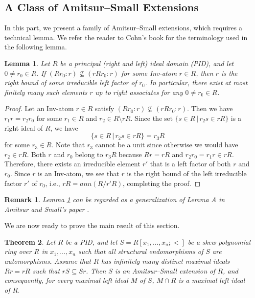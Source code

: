 \documentclass[11pt,a4paper]{article}
\theoremstyle{theorem}
\newtheorem{theorem}{Theorem}[section]
\newtheorem{lemma}[theorem]{Lemma}
\newtheorem{remark}{Remark}[section]
\numberwithin{equation}{section}
\begin{document}
	\subsection{A Class of Amitsur--Small Extensions}
			In this part, we present a family of Amitsur--Small extensions, which requires  a technical lemma. We refer the reader to Cohn's book \cite{Freeidealrings} for the terminology used in the following lemma. 
		\begin{lemma}\label{lem: LemmaA-Inv}
		Let $R$ be a principal (right and left) ideal domain (PID), and let $0\neq r_0\in R$. If 
		$(Rr_0:r)\nsubseteq (rRr_0:r)$
		for some Inv-atom $r\in R$, then $r$ is the right bound of some irreducible left factor of $r_0$. In particular, there exist at most finitely many such elements $r$ up to right associates for any $0\neq r_0\in R$. 
	\end{lemma}
	\begin{proof}
		Let an Inv-atom $r\in R$ satisfy 
		$(Rr_0:r)\nsubseteq (rRr_0:r).$
		Then  we have
		$r_1r=r_2r_0$ for some \(r_1\in R\) and $r_2\in R\setminus rR$. Since  the set 
		$\{s\in R\, |\, r_2s\in rR\}$
		is a right ideal of $R$, we have
		$$\{s\in R\, |\, r_2s\in rR\}=r_3R$$ for some $r_3\in R$. Note that $r_3$ cannot be a unit since otherwise we would have $r_2\in rR$.
		Both $r$ and $r_0$ belong to $r_3R$ because \(Rr=rR\) and \(r_2r_0 = r_1r\in rR\). Therefore, there exists an irreducible element $r'$ that is a left factor of both
		$r$ and $r_0$. Since $r$ is an Inv-atom, we see that $r$ is the right bound of the left irreducible factor $r'$ of $r_0$, i.e.,  $rR=ann(R/r'R)$, completing the proof.    
	\end{proof}
		\begin{remark}
			Lemma \ref{lem: LemmaA-Inv} can be regarded as a generalization of Lemma A in  Amitsur and Small's paper \cite{AmitsurSmall}. 
		\end{remark}
	We are now ready to prove the main result of this section. 
		\begin{theorem}\label{thm: A-Inv}
			Let $R$ be a PID, and let 
			$S=R[x_1,\dots,x_n;<]$ be a skew polynomial ring over $R$ in $x_1,\dots,x_n$  such that all structural endomorphisms of \(S\)  are automorphisms. 
			 Assume that  $R$ has  infinitely many distinct maximal ideals $Rr=rR$ such that $rS\subseteq Sr$. 
			Then  $S$ is an Amitsur--Small extension of $R$, and consequently, for every maximal left ideal \(M\) of \(S\), \(M\cap R\) is a maximal left ideal of \(R\).     
		\end{theorem}
\end{document}
